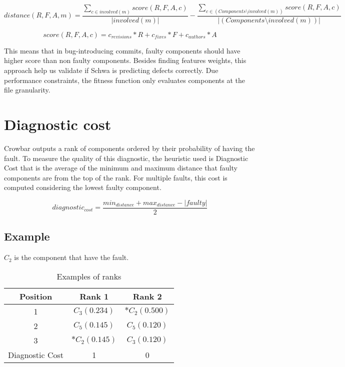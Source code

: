 \begin{equation}
distance(R,F,A,m) = \frac{ \sum_{c \in involved(m)}^{} score(R,F,A,c) }{|involved(m)|} - \frac{ \sum_{c \in (Components \setminus involved(m))}^{} score(R,F,A,c) }{|(Components \setminus involved(m))|}
\end{equation}

\begin{equation}
score(R,F,A,c) = c_{revisions} * R + c_{fixes} * F + c_{authors} * A
\end{equation}

This means that in bug-introducing commits, faulty components should have higher score than non faulty components. Besides finding features weights, this approach help us validate if Schwa is predicting defects correctly. Due performance constraints, the fitness function only evaluates components at the file granularity.

\section{Diagnostic cost}
Crowbar outputs a rank of components ordered by their probability of having the fault. To measure the quality of this diagnostic, the heuristic used is Diagnostic Cost \cite{6693085} that is the average of the minimum and maximum distance that faulty components are from the top of the rank. For multiple faults, this cost is computed considering the lowest faulty component.

\begin{equation}
diagnostic_{cost} = \frac{min_{distance} + max_{distance} - |faulty|}{2}
\end{equation}

\subsection{Example}
\( C_2 \) is the component that have the fault.

\begin{table}[h]
\centering
\caption{Examples of ranks}
\label{my-label}
\begin{tabular}{|c|c|c|}
\hline
Position & Rank 1 & Rank 2 \\ \hline
    1    &   \( C_3(0.234) \)   &  \( *C_2(0.500) \)     \\ \hline
    2    &   \( C_5(0.145) \)   &  \( C_5(0.120) \)     \\ \hline
    3    &   \( *C_2(0.145) \)   &  \( C_3(0.120) \)   \\ \hline
    Diagnostic Cost   &   1   &  0  \\ \hline
\end{tabular}
\end{table}


